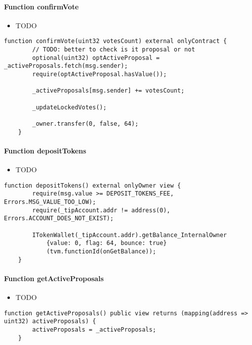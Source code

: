 \paragraph{Function confirmVote}

\begin{itemize}
\item TODO
\end{itemize}

\begin{lstlisting}[firstnumber=74]
    function confirmVote(uint32 votesCount) external onlyContract {
        // TODO: better to check is it proposal or not
        optional(uint32) optActiveProposal = _activeProposals.fetch(msg.sender);
        require(optActiveProposal.hasValue());

        _activeProposals[msg.sender] += votesCount;
        
        _updateLockedVotes();

        _owner.transfer(0, false, 64);
    }
\end{lstlisting}

\paragraph{Function depositTokens}

\begin{itemize}
\item TODO
\end{itemize}

\begin{lstlisting}[firstnumber=172]
    function depositTokens() external onlyOwner view {
        require(msg.value >= DEPOSIT_TOKENS_FEE, Errors.MSG_VALUE_TOO_LOW);
        require(_tipAccount.addr != address(0), Errors.ACCOUNT_DOES_NOT_EXIST);

        ITokenWallet(_tipAccount.addr).getBalance_InternalOwner
            {value: 0, flag: 64, bounce: true}
            (tvm.functionId(onGetBalance));
    }
\end{lstlisting}

\paragraph{Function getActiveProposals}

\begin{itemize}
\item TODO
\end{itemize}

\begin{lstlisting}[firstnumber=228]
    function getActiveProposals() public view returns (mapping(address => uint32) activeProposals) {
        activeProposals = _activeProposals;
    }
\end{lstlisting}


